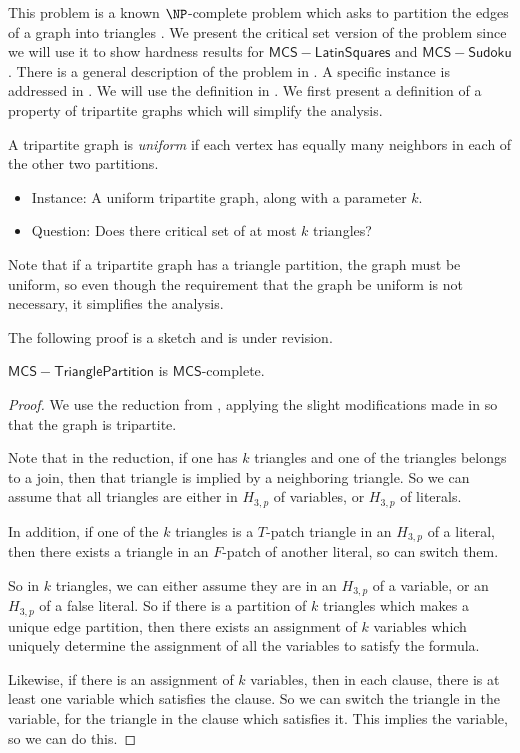 \documentclass[runningheads,a4paper]{llncs}
\begin{document}
This problem is a known $\NP$-complete problem which asks to partition the edges of a graph into triangles \cite{holyer1981np}. We present the critical set version of the problem since we will use it to show hardness results for $\mathsf{MCS-Latin Squares}$ and $\mathsf{MCS-Sudoku}$. There is a general description of the problem in \cite{holyer1981np}. A specific instance is addressed in \cite{colbourn1984complexity}. We will use the definition in \cite{colbourn1984complexity}. We first present a definition of a property of tripartite graphs which will simplify the analysis.

\begin{definition}
A tripartite graph is \emph{uniform} if each vertex has equally many neighbors in each of the other two partitions.
\end{definition}

\begin{itemize}
\item Instance: A uniform tripartite graph, along with a parameter $k$.
\item Question: Does there critical set of at most $k$ triangles?
\end{itemize}

Note that if a tripartite graph has a triangle partition, the graph must be uniform, so even though the requirement that the graph be uniform is not necessary, it simplifies the analysis.

The following proof is a sketch and is under revision.

\begin{theorem}
$\mathsf{MCS-Triangle Partition}$ is $\mathsf{MCS}$-complete.
\end{theorem}

\begin{proof}
We use the reduction from \cite{holyer1981np}, applying the slight modifications made in \cite{colbourn1984complexity} so that the graph is tripartite. 

Note that in the reduction, if one has $k$ triangles and one of the triangles belongs to a join, then that triangle is implied by a neighboring triangle. So we can assume that all triangles are either in $H_{3,p}$ of variables, or $H_{3,p}$ of literals. 

In addition, if one of the $k$ triangles is a $T$-patch triangle in an $H_{3,p}$ of a literal, then there exists a triangle in an $F$-patch of another literal, so can switch them.

So in $k$ triangles, we can either assume they are in an $H_{3,p}$ of a variable, or an $H_{3,p}$ of a false literal. So if there is a partition of $k$ triangles which makes a unique edge partition, then there exists an assignment of $k$ variables which uniquely determine the assignment of all the variables to satisfy the formula. 

Likewise, if there is an assignment of $k$ variables, then in each clause, there is at least one variable which satisfies the clause. So we can switch the triangle in the variable, for the triangle in the clause which satisfies it. This implies the variable, so we can do this.
\end{proof}
\end{document}
